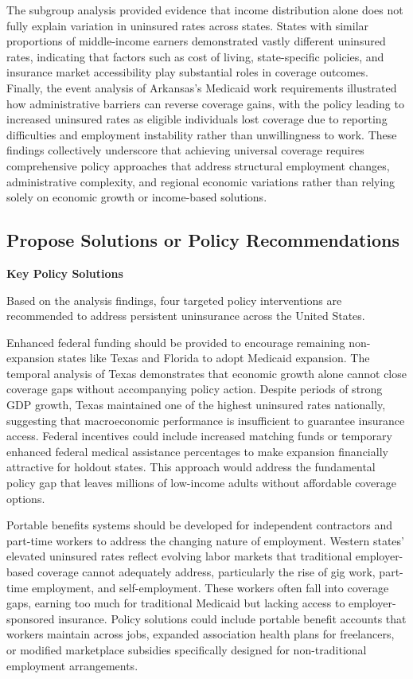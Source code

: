 \documentclass[
]{article}
\begin{document}
The subgroup analysis provided evidence that income distribution alone
does not fully explain variation in uninsured rates across states.
States with similar proportions of middle-income earners demonstrated
vastly different uninsured rates, indicating that factors such as cost
of living, state-specific policies, and insurance market accessibility
play substantial roles in coverage outcomes. Finally, the event analysis
of Arkansas's Medicaid work requirements illustrated how administrative
barriers can reverse coverage gains, with the policy leading to
increased uninsured rates as eligible individuals lost coverage due to
reporting difficulties and employment instability rather than
unwillingness to work. These findings collectively underscore that
achieving universal coverage requires comprehensive policy approaches
that address structural employment changes, administrative complexity,
and regional economic variations rather than relying solely on economic
growth or income-based solutions.

\subsection{Propose Solutions or Policy
Recommendations}\label{propose-solutions-or-policy-recommendations}

\textbf{Key Policy Solutions}

Based on the analysis findings, four targeted policy interventions are
recommended to address persistent uninsurance across the United States.

Enhanced federal funding should be provided to encourage remaining
non-expansion states like Texas and Florida to adopt Medicaid expansion.
The temporal analysis of Texas demonstrates that economic growth alone
cannot close coverage gaps without accompanying policy action. Despite
periods of strong GDP growth, Texas maintained one of the highest
uninsured rates nationally, suggesting that macroeconomic performance is
insufficient to guarantee insurance access. Federal incentives could
include increased matching funds or temporary enhanced federal medical
assistance percentages to make expansion financially attractive for
holdout states. This approach would address the fundamental policy gap
that leaves millions of low-income adults without affordable coverage
options.

Portable benefits systems should be developed for independent
contractors and part-time workers to address the changing nature of
employment. Western states' elevated uninsured rates reflect evolving
labor markets that traditional employer-based coverage cannot adequately
address, particularly the rise of gig work, part-time employment, and
self-employment. These workers often fall into coverage gaps, earning
too much for traditional Medicaid but lacking access to
employer-sponsored insurance. Policy solutions could include portable
benefit accounts that workers maintain across jobs, expanded association
health plans for freelancers, or modified marketplace subsidies
specifically designed for non-traditional employment arrangements.
\end{document}
